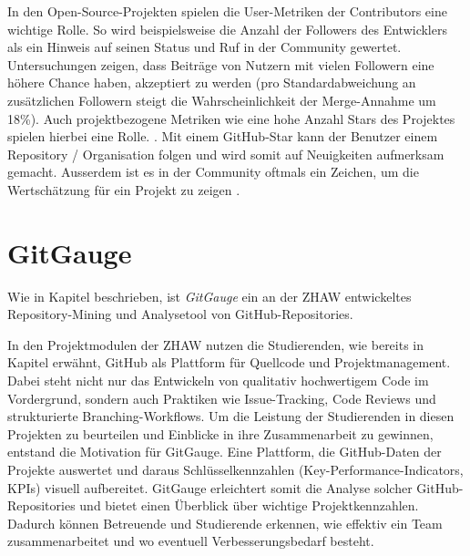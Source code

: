 In den Open-Source-Projekten spielen die User-Metriken der Contributors eine wichtige Rolle. So wird beispielsweise die Anzahl der Followers des Entwicklers als ein Hinweis auf seinen Status und Ruf in der Community gewertet. Untersuchungen zeigen, dass Beiträge von Nutzern mit vielen Followern eine höhere Chance haben, akzeptiert zu werden (pro Standardabweichung an zusätzlichen Followern steigt die Wahrscheinlichkeit der Merge-Annahme um 18\%). Auch projektbezogene Metriken wie eine hohe Anzahl Stars des Projektes spielen hierbei eine Rolle. \parencite{tsay_influence_2014}. Mit einem GitHub-Star kann der Benutzer einem Repository / Organisation folgen und wird somit auf Neuigkeiten aufmerksam gemacht. Ausserdem ist es in der Community oftmals ein Zeichen, um die Wertschätzung für ein Projekt zu zeigen \parencite{noauthor_saving_nodate}. \parencite{tsay_influence_2014}

\section{GitGauge}
Wie in Kapitel  beschrieben, ist \textit{GitGauge} ein an der ZHAW entwickeltes Repository-Mining und Analysetool von GitHub-Repositories.

In den Projektmodulen der ZHAW nutzen die Studierenden, wie bereits in Kapitel  erwähnt,  GitHub als Plattform für Quellcode und Projektmanagement. Dabei steht nicht nur das Entwickeln von qualitativ hochwertigem Code im Vordergrund, sondern auch Praktiken wie Issue-Tracking, Code Reviews und strukturierte Branching-Workflows. Um die Leistung der Studierenden in diesen Projekten zu beurteilen und Einblicke in ihre Zusammenarbeit zu gewinnen, entstand die Motivation für GitGauge. Eine Plattform, die GitHub-Daten der Projekte auswertet und daraus Schlüsselkennzahlen (Key-Performance-Indicators, KPIs) visuell aufbereitet. GitGauge erleichtert somit die Analyse solcher GitHub-Repositories und bietet einen Überblick über wichtige Projektkennzahlen. Dadurch können Betreuende und Studierende erkennen, wie effektiv ein Team zusammenarbeitet und wo eventuell Verbesserungsbedarf besteht. \parencite{grand_joel_vt1_joelgrand_repository_2024}

